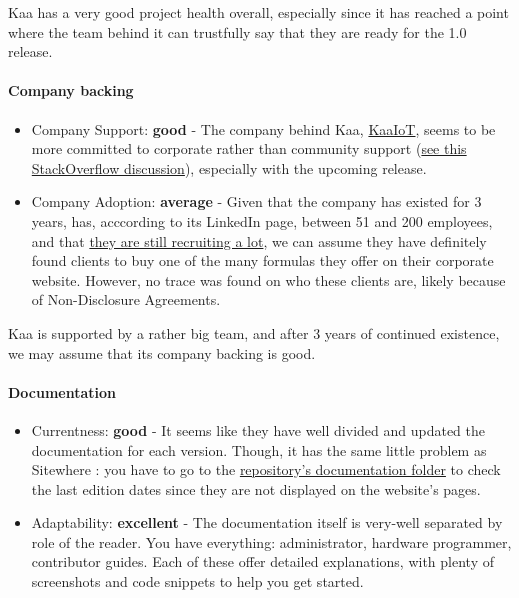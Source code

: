 \documentclass{article}
\begin{document}
Kaa has a very good project health overall, especially since it has reached a point where the team behind it can trustfully say that they are ready for the 1.0 release.

\paragraph{Company backing}

\begin{itemize}
\item Company Support: \textbf{good} - The company behind Kaa, \href{https://www.kaaiot.io/}{KaaIoT}, seems to be more committed to corporate rather than community support (\href{https://stackoverflow.com/questions/44330714/why-are-the-questions-about-kaa-basically-not-being-answered}{see this StackOverflow discussion}), especially with the upcoming release.
\item Company Adoption: \textbf{average} - Given that the company has existed for 3 years, has, acccording to its LinkedIn page, between 51 and 200 employees, and that \href{https://www.kaaiot.io/company/careers/}{they are still recruiting a lot}, we can assume they have definitely found clients to buy one of the many formulas they offer on their corporate website. However, no trace was found on who these clients are, likely because of Non-Disclosure Agreements.
\end{itemize}

Kaa is supported by a rather big team, and after 3 years of continued existence, we may assume that its company backing is good.

\paragraph{Documentation}

\begin{itemize}
\item Currentness: \textbf{good} - It seems like they have well divided and updated the documentation for each version. Though, it has the same little problem as Sitewhere : you have to go to the \href{https://github.com/kaaproject/kaa/blob/master/doc/}{repository's documentation folder} to check the last edition dates since they are not displayed on the website's pages.
\item Adaptability: \textbf{excellent} - The documentation itself is very-well separated by role of the reader. You have everything: administrator, hardware programmer, contributor guides. Each of these offer detailed explanations, with plenty of screenshots and code snippets to help you get started.
\end{itemize}
\end{document}
